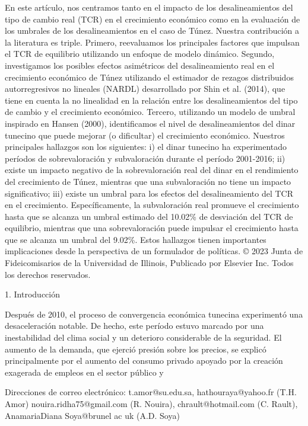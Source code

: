 \documentclass[11pt,a4paper]{article}
\begin{document}
En este artículo, nos centramos tanto en el impacto de los desalineamientos del tipo de cambio real (TCR) en el crecimiento económico como en la evaluación de los umbrales de los desalineamientos en el caso de Túnez. Nuestra contribución a la literatura es triple. Primero, reevaluamos los principales factores que impulsan el TCR de equilibrio utilizando un enfoque de modelo dinámico. Segundo, investigamos los posibles efectos asimétricos del desalineamiento real en el crecimiento económico de Túnez utilizando el estimador de rezagos distribuidos autorregresivos no lineales (NARDL) desarrollado por Shin et al. (2014), que tiene en cuenta la no linealidad en la relación entre los desalineamientos del tipo de cambio y el crecimiento económico. Tercero, utilizando un modelo de umbral inspirado en Hansen (2000), identificamos el nivel de desalineamientos del dinar tunecino que puede mejorar (o dificultar) el crecimiento económico. Nuestros principales hallazgos son los siguientes: i) el dinar tunecino ha experimentado períodos de sobrevaloración y subvaloración durante el período 2001-2016; ii) existe un impacto negativo de la sobrevaloración real del dinar en el rendimiento del crecimiento de Túnez, mientras que una subvaloración no tiene un impacto significativo; iii) existe un umbral para los efectos del desalineamiento del TCR en el crecimiento. Específicamente, la subvaloración real promueve el crecimiento hasta que se alcanza un umbral estimado del 10.02\% de desviación del TCR de equilibrio, mientras que una sobrevaloración puede impulsar el crecimiento hasta que se alcanza un umbral del 9.02\%. Estos hallazgos tienen importantes implicaciones desde la perspectiva de un formulador de políticas. © 2023 Junta de Fideicomisarios de la Universidad de Illinois, Publicado por Elsevier Inc. Todos los derechos reservados.

1. Introducción

Después de 2010, el proceso de convergencia económica tunecina experimentó una desaceleración notable. De hecho, este período estuvo marcado por una inestabilidad del clima social y un deterioro considerable de la seguridad. El aumento de la demanda, que ejerció presión sobre los precios, se explicó principalmente por el aumento del consumo privado apoyado por la creación exagerada de empleos en el sector público y

Direcciones de correo electrónico: t.amor@su.edu.sa, hathouraya@yahoo.fr (T.H. Amor)
nouira.ridha75@gmail.com (R. Nouira), chrault@hotmail.com (C. Rault),
AnamariaDiana Soya@brunel ac uk (A.D. Soya)
\end{document}

